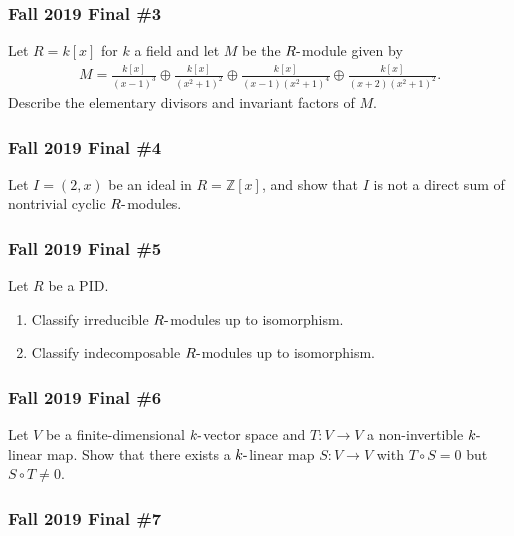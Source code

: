 \hypertarget{fall-2019-final-3}{%
\subsubsection{Fall 2019 Final \#3}\label{fall-2019-final-3}}

Let \(R = k[x]\) for \(k\) a field and let \(M\) be the
\(R{\hbox{-}}\)module given by
\begin{align*}
M=\frac{k[x]}{(x-1)^{3}} \oplus \frac{k[x]}{\left(x^{2}+1\right)^{2}} \oplus \frac{k[x]}{(x-1)\left(x^{2}+1\right)^{4}} \oplus \frac{k[x]}{(x+2)\left(x^{2}+1\right)^{2}}
.\end{align*}
Describe the elementary divisors and invariant factors of \(M\).

\hypertarget{fall-2019-final-4}{%
\subsubsection{Fall 2019 Final \#4}\label{fall-2019-final-4}}

Let \(I = (2, x)\) be an ideal in \(R = {\mathbb{Z}}[x]\), and show that
\(I\) is not a direct sum of nontrivial cyclic \(R{\hbox{-}}\)modules.

\hypertarget{fall-2019-final-5}{%
\subsubsection{Fall 2019 Final \#5}\label{fall-2019-final-5}}

Let \(R\) be a PID.

\begin{enumerate}
\def\labelenumi{\alph{enumi}.}
\item
  Classify irreducible \(R{\hbox{-}}\)modules up to isomorphism.
\item
  Classify indecomposable \(R{\hbox{-}}\)modules up to isomorphism.
\end{enumerate}

\hypertarget{fall-2019-final-6}{%
\subsubsection{Fall 2019 Final \#6}\label{fall-2019-final-6}}

Let \(V\) be a finite-dimensional \(k{\hbox{-}}\)vector space and
\(T:V\to V\) a non-invertible \(k{\hbox{-}}\)linear map. Show that there
exists a \(k{\hbox{-}}\)linear map \(S:V\to V\) with \(T\circ S = 0\)
but \(S\circ T\neq 0\).

\hypertarget{fall-2019-final-7}{%
\subsubsection{Fall 2019 Final \#7}\label{fall-2019-final-7}}

